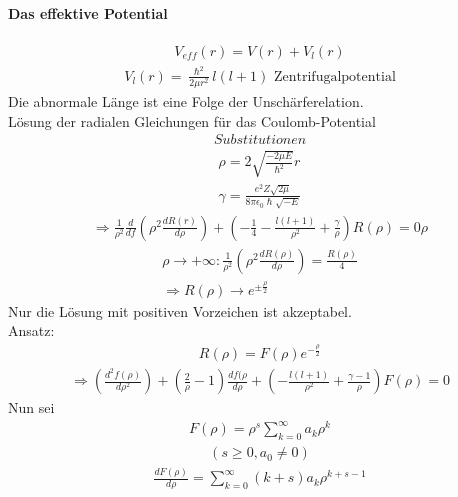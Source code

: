 \documentclass[10pt,a4paper]{article}
\begin{document}
\paragraph{Das effektive Potential}$\,$ \\
\begin{align}
V_{eff}(r)= V(r)+V_l(r)
\end{align}
\begin{align}
V_l(r)=\frac{\hslash ^2}{2 \mu r^2} l(l+1) \text{ Zentrifugalpotential}
\end{align}
Die abnormale Länge ist eine Folge der Unschärferelation.\\
Lösung der radialen Gleichungen für das Coulomb-Potential
\begin{align}
Substitutionen
\end{align}
\begin{align}
\rho =2 \sqrt{\frac{-2 \mu E}{\hslash ^2}} r \\
\gamma = \frac{e^2 Z \sqrt{2 \mu}}{ 8 \pi \epsilon_0 \hslash \sqrt{-E}}
\end{align}
\begin{align}
\Rightarrow \frac{1}{\rho^2} \frac{d}{df}(\rho^2 \frac{d R(r)}{d \rho})+(-\frac{1}{4} -\frac{l(l+1)}{\rho^2}+\frac{\gamma}{\rho}) R(\rho)=0
\rho
\end{align}
\begin{align}
\rho \longrightarrow +\infty : \frac{1}{\rho^2}(\rho^2 \frac{dR(\rho)}{d \rho}) = \frac{R(\rho)}{4}\\
\Rightarrow R(\rho)\longrightarrow e^{\pm \frac{\rho}{2}}
\end{align}
Nur die Lösung mit positiven Vorzeichen ist akzeptabel.\\
Ansatz:
\begin{align}
R(\rho)=F(\rho) e^{-\frac{\rho}{2}}
\end{align}
\begin{align}
\Rightarrow (\frac{d^2f(\rho)}{d \rho^2})+(\frac{2}{\rho}-1)\frac{df(\rho}{d\rho}+(-\frac{l(l+1)}{\rho^2}+\frac{\gamma -1}{\rho})F(\rho)=0
\end{align}
Nun sei
\begin{align}
F(\rho)= \rho^s \sum_{k=0}^{\infty} a_k \rho ^k
\end{align}
\begin{align}
(s\geq 0, a_0 \neq 0)
\end{align}
\begin{align}
\frac{dF(\rho)}{d\rho}= \sum_{k=0}^{\infty} (k+s) a_k \rho^{k+s-1}
\end{align}
\end{document}
